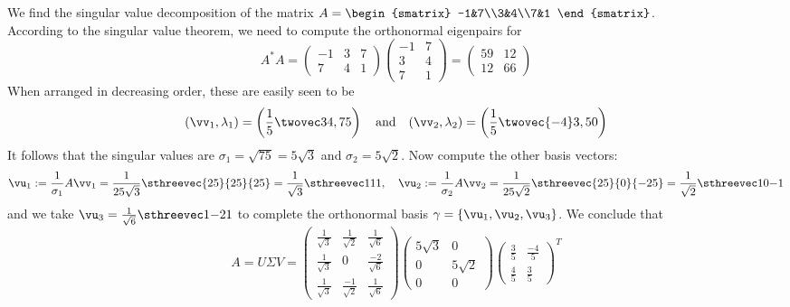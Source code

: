\begin{example}{}{}
We find the singular value decomposition of the matrix $A=\begin{smatrix}
  -1&7\\3&4\\7&1
  \end{smatrix}$.\\[5pt]
  According to the singular value theorem, we need to compute the orthonormal eigenpairs for
  \[A^*A=\begin{pmatrix}
  -1&3&7\\7&4&1
  \end{pmatrix}\begin{pmatrix}
  -1&7\\3&4\\7&1
  \end{pmatrix}
  =\begin{pmatrix}
  59&12\\12&66
  \end{pmatrix}\]
  When arranged in decreasing order, these are easily seen to be\
  \[(\vv_1,\lambda_1)=\left(\frac 15\twovec 34,75\right)\quad\text{and}\quad(\vv_2,\lambda_2)=\left(\frac 15\twovec{-4}3,50\right)\]
  It follows that the singular values are $\sigma_1=\sqrt{75}=5\sqrt 3$ and $\sigma_2=5\sqrt 2$. Now compute the other basis vectors:
  \[\vu_1:=\frac 1{\sigma_1}A\vv_1=\frac 1{25\sqrt 3}\sthreevec{25}{25}{25}=\frac 1{\sqrt 3}\sthreevec 111,\quad \vu_2:=\frac 1{\sigma_2}A\vv_2=\frac 1{25\sqrt 2}\sthreevec{25}{0}{-25}=\frac 1{\sqrt 2}\sthreevec 10{-1}\]
  and we take $\vu_3=\frac 1{\sqrt 6}\sthreevec 1{-2}1$ to complete the orthonormal basis $\gamma=\{\vu_1,\vu_2,\vu_3\}$. We conclude that
  \[A=U\Sigma V=
  \begin{pmatrix}
  \frac 1{\sqrt 3}&\frac 1{\sqrt 2}&\frac 1{\sqrt 6}\\
  \frac 1{\sqrt 3}&0&\frac{-2}{\sqrt 6}\\
  \frac 1{\sqrt 3}&\frac{-1}{\sqrt 2}&\frac 1{\sqrt 6} 
  \end{pmatrix}
  \begin{pmatrix}
  5\sqrt 3&0\\0&5\sqrt 2\\0&0
  \end{pmatrix}
  \begin{pmatrix}
  \frac 35&\frac{-4}5\\\frac 45&\frac 35 
  \end{pmatrix}^T\]
\end{example}

